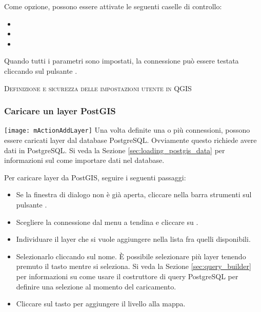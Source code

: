 Come opzione, possono essere attivate le seguenti caselle di controllo:

\begin{itemize}
\item {}
\item {}
\item {}
\end{itemize}

Quando tutti i parametri sono impostati, la connessione può essere testata
cliccando sul pulsante  .

\begin{Tip}\caption{\textsc{Definizione e sicurezza delle impostazioni utente in QGIS}}
\end{Tip}

\subsubsection{Caricare un layer PostGIS}

\texttt{[image: mActionAddLayer]} Una volta definite una o più
connessioni, possono essere caricati layer dal database PostgreSQL.
Ovviamente questo richiede avere dati in PostgreSQL. Si veda la Sezione
\ref{sec:loading_postgis_data} per informazioni sul come importare dati nel
database. 

Per caricare layer da PostGIS, seguire i seguenti passaggi:

\begin{itemize}
\item Se la finestra di dialogo  non è già
aperta, cliccare nella barra strumenti sul pulsante
.
\item Scegliere la connessione dal menu a tendina e cliccare su .
\item Individuare il layer che si vuole aggiungere nella lista fra quelli disponibili.
\item Selezionarlo cliccando sul nome. È possibile selezionare più layer
tenendo premuto il tasto  mentre si seleziona. Si veda la
Sezione \ref{sec:query_builder} per informazioni su come usare il costruttore
di query PostgreSQL per definire una selezione al momento del caricamento.
\item Cliccare sul tasto  per aggiungere il livello alla mappa.
\end{itemize}

